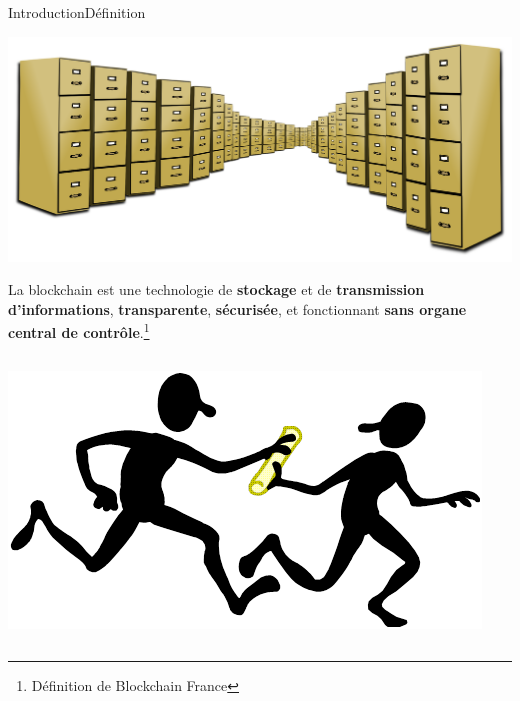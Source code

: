 \documentclass[xcolor=dvipsnames]{beamer}
\begin{document}
\begin{frame}{Introduction}{Définition}
\vspace{-1cm}
	\begin{center}
		\includegraphics[scale=0.1]{storage.png} 
	\end{center}
	
	\begin{center}
	La blockchain est une technologie de \textbf{stockage} et de \textbf{transmission d’informations}, \textbf{transparente}, \textbf{sécurisée}, et fonctionnant \textbf{sans organe central de contrôle}.\footnote{\hspace{5pt}Définition de Blockchain France}
	\end{center}
	
	\begin{columns}
    	\begin{column}{0.48\textwidth}
    		\begin{center}
    			\includegraphics[scale=0.25]{relay.png} 
    		\end{center}
    	\end{column}
    	

\end{columns}
\end{frame}
\end{document}

